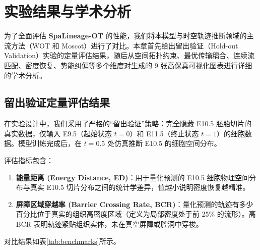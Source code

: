
\chapter{实验结果与学术分析}
\label{ch:results}

为了全面评估 \textbf{SpaLineage-OT} 的性能，我们将本模型与时空轨迹推断领域的主流方法（WOT\cite{Schiebinger2019} 和 Moscot\cite{Klein2024}）进行了对比。本章首先给出留出验证（Hold-out Validation）实验的定量评估结果，随后从空间拓扑约束、最优传输耦合、连续流匹配、密度恢复、势能纠偏等多个维度对生成的 9 张高保真可视化图表进行详细的学术分析。

\section{留出验证定量评估结果}
在实验设计中，我们采用了严格的“留出验证”策略：完全隐藏 E10.5 胚胎切片的真实数据，仅输入 E9.5（起始状态 $t=0$）和 E11.5（终止状态 $t=1$）的细胞数据。模型训练完成后，在 $t=0.5$ 处仿真推断 E10.5 的细胞空间分布。

评估指标包含：
\begin{enumerate}
    \item \textbf{能量距离 (Energy Distance, ED)}：用于量化预测的 E10.5 细胞物理空间分布与真实 E10.5 切片分布之间的统计学差异，值越小说明密度恢复越精准。
    \item \textbf{屏障区域穿越率 (Barrier Crossing Rate, BCR)}：量化预测的轨迹有多少百分比位于真实的组织高密度区域（定义为局部密度处于前 25\% 的流形）。高 BCR 表明轨迹紧贴组织实体，未在真空屏障或腔洞中穿梭。
\end{enumerate}

对比结果如表\ref{tab:benchmarks}所示。

\begin{table}[H]
    \centering
    \caption{不同算法在时空谱系追踪 Hold-out 验证中的指标对照}
    \label{tab:benchmarks}
\end{table}

